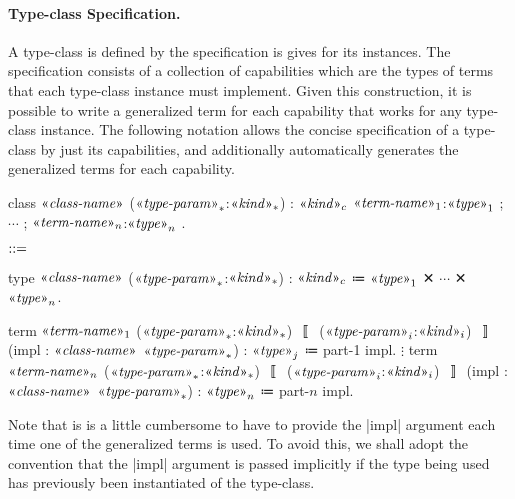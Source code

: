 \paragraph{Type-class Specification.}
A type-class is defined by the specification is gives for its instances.
The specification consists of a collection of capabilities which are the types of terms that each type-class instance must implement.
Given this construction, it is possible to write a generalized term for each capability that works for any type-class instance.
The following notation allows the concise specification of a type-class by just its capabilities, and additionally automatically generates the generalized terms for each capability.
%
\begin{notational}[caption={Notation for type-class specification},  label={lst:notation-type-class-def}]
class $\mvar{class-name}$ ($\mvar{type-param}_*$:$\mvar{kind}_*$) : $\mvar{kind}_c$
  { $\mvar{term-name}_1$:$\mvar{type}_1$ ; $\cdots$ ; $\mvar{term-name}_n$:$\mvar{type}_n$ }.

$\syneq$

type $\mvar{class-name}$ ($\mvar{type-param}_*$:$\mvar{kind}_*$) : $\mvar{kind}_c$
  ≔ $\mvar{type}_1$ ✕ $\cdots$ ✕ $\mvar{type}_n$.

term $\mvar{term-name}_1$ ($\mvar{type-param}_*$:$\mvar{kind}_*$) $〚$ ($\mvar{type-param}_i$:$\mvar{kind}_i$) $〛$
      (impl : $\mvar{class-name}$ $\mvar{type-param}_*$)
  : $\mvar{type}_j$
  ≔ part-1 impl.
$\vdots$
term $\mvar{term-name}_n$ ($\mvar{type-param}_*$:$\mvar{kind}_*$) $〚$ ($\mvar{type-param}_i$:$\mvar{kind}_i$) $〛$
      (impl : $\mvar{class-name}$ $\mvar{type-param}_*$)
  : $\mvar{type}_n$
  ≔ part-$n$ impl.
\end{notational}
%
Note that is is a little cumbersome to have to provide the \code|impl| argument each time one of the generalized terms is used.
To avoid this, we shall adopt the convention that the \code|impl| argument is passed implicitly if the type being used has previously been instantiated of the type-class.

\newpage
